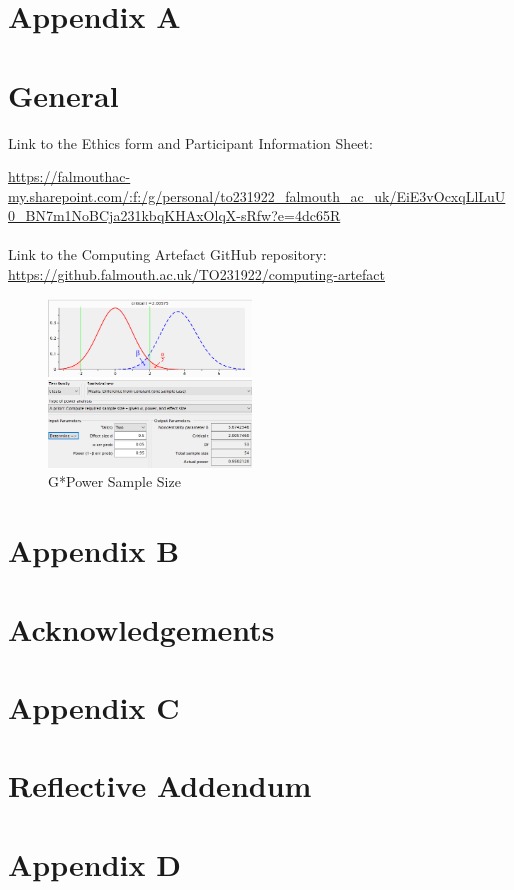 \newpage
\section*{Appendix A} \label{append:a}
\section*{General}
Link to the Ethics form and Participant Information Sheet:

\url{https://falmouthac-my.sharepoint.com/:f:/g/personal/to231922_falmouth_ac_uk/EiE3vOcxqLlLuU0_BN7m1NoBCja231kbqKHAxOlqX-sRfw?e=4dc65R}
\\
\\
Link to the Computing Artefact GitHub repository: 
\url{https://github.falmouth.ac.uk/TO231922/computing-artefact}
\begin{figure}[ht]
    \includegraphics[width=0.48\textwidth]{./Images/gpower.png}
    \centering
    \caption{G*Power Sample Size}
    \label{gpower}
\end{figure}

\newpage
\section*{Appendix B}
\section*{Acknowledgements}
\label{append:b}

\newpage
\section*{Appendix C}
\section*{Reflective Addendum}
\label{append:C}


\newpage
\section*{Appendix D}
